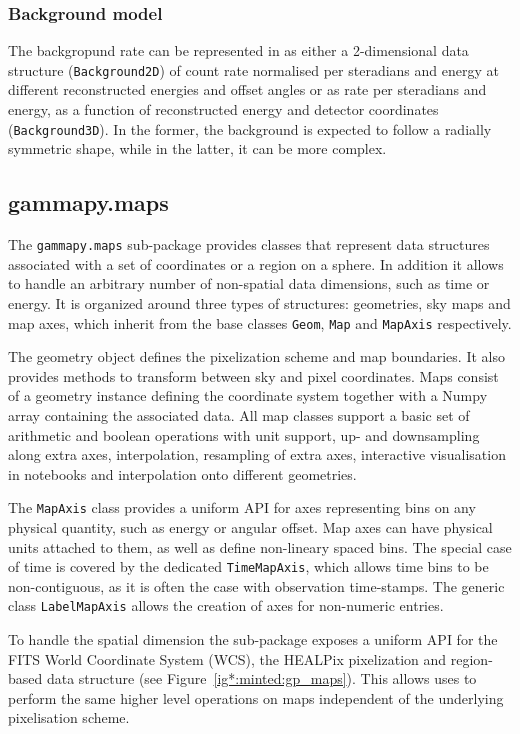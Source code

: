 \documentclass[traditabstract, longauth]{aa}
\newcommand{\code}[1]{\texttt{#1}}
\begin{document}
{\subsubsection{Background model}
The backgropund rate can be represented in \gammapy as either a 2-dimensional
data structure (\code{Background2D}) of count rate normalised per steradians and energy at different
reconstructed energies and offset angles or as rate per steradians and energy, as a
function of reconstructed energy and detector coordinates (\code{Background3D}).
In the former, the background is expected to follow a radially symmetric shape,
while in the latter, it can be more complex.


\subsection{gammapy.maps}
\label{ssec:gammapy-maps}
The \code{gammapy.maps} sub-package provides classes that represent data
structures associated with a set of coordinates or a region on a sphere. In
addition it allows to handle an arbitrary number of non-spatial data
dimensions, such as time or energy. It is organized around three types of
structures: geometries, sky maps and map axes, which inherit from the base
classes \code{Geom}, \code{Map} and \code{MapAxis} respectively.

The geometry object defines the pixelization scheme and map boundaries. It also
provides methods to transform between sky and pixel coordinates. Maps consist
of a geometry instance defining the coordinate system together with a
Numpy array containing the associated data. All map classes support a basic
set of arithmetic and boolean operations with  unit support, up- and downsampling
along extra axes, interpolation, resampling of extra axes, interactive visualisation
in notebooks and interpolation onto different geometries.

The \code{MapAxis} class provides a uniform API for axes representing
bins on any physical quantity, such as energy or angular offset.
Map axes can have physical units attached to them, as well as define
non-lineary spaced bins. The special case of time is covered by the
dedicated \code{TimeMapAxis}, which allows time bins to be non-contiguous,
as it is often the case with observation time-stamps. The generic
class \code{LabelMapAxis} allows the creation of axes for non-numeric entries.

To handle the spatial dimension the sub-package exposes a uniform API for
the FITS World Coordinate System (WCS), the HEALPix pixelization and
region-based data structure (see Figure~\ref{ig*:minted:gp_maps}).
This allows uses to perform the same higher level operations on maps
independent of the underlying pixelisation scheme.

}
\end{document}
